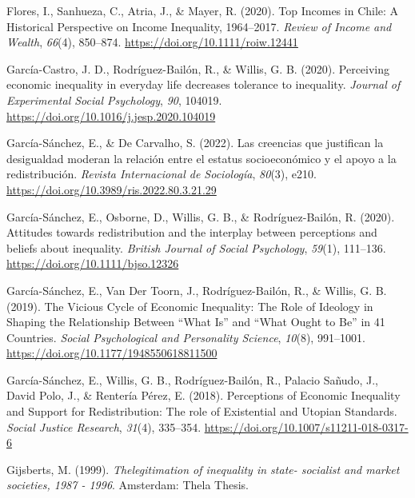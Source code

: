 \documentclass[
  12pt,
]{article}
\newlength{\cslhangindent}
\newenvironment{CSLReferences}[2] %
 {\begin{list}{}{%
  \setlength{\itemindent}{0pt}
  \setlength{\leftmargin}{0pt}
  \setlength{\parsep}{0pt}
  \ifodd #1
   \setlength{\leftmargin}{\cslhangindent}
   \setlength{\itemindent}{-1\cslhangindent}
  \fi
  \setlength{\itemsep}{#2\baselineskip}}}
 {\end{list}}
\begin{document}
\begin{CSLReferences}{1}{0}
Flores, I., Sanhueza, C., Atria, J., \& Mayer, R. (2020). Top {Incomes}
in {Chile}: {A Historical Perspective} on {Income Inequality},
1964--2017. \emph{Review of Income and Wealth}, \emph{66}(4), 850--874.
\url{https://doi.org/10.1111/roiw.12441}

García-Castro, J. D., Rodríguez-Bailón, R., \& Willis, G. B. (2020).
Perceiving economic inequality in everyday life decreases tolerance to
inequality. \emph{Journal of Experimental Social Psychology}, \emph{90},
104019. \url{https://doi.org/10.1016/j.jesp.2020.104019}

García-Sánchez, E., \& De Carvalho, S. (2022). Las creencias que
justifican la desigualdad moderan la relaci{ó}n entre el estatus
socioecon{ó}mico y el apoyo a la redistribuci{ó}n. \emph{Revista
Internacional de Sociolog{í}a}, \emph{80}(3), e210.
\url{https://doi.org/10.3989/ris.2022.80.3.21.29}

García-Sánchez, E., Osborne, D., Willis, G. B., \& Rodríguez-Bailón, R.
(2020). Attitudes towards redistribution and the interplay between
perceptions and beliefs about inequality. \emph{British Journal of
Social Psychology}, \emph{59}(1), 111--136.
\url{https://doi.org/10.1111/bjso.12326}

García-Sánchez, E., Van Der Toorn, J., Rodríguez-Bailón, R., \& Willis,
G. B. (2019). The {Vicious Cycle} of {Economic Inequality}: {The Role}
of {Ideology} in {Shaping} the {Relationship Between} {``{What Is}''}
and {``{What Ought} to {Be}''} in 41 {Countries}. \emph{Social
Psychological and Personality Science}, \emph{10}(8), 991--1001.
\url{https://doi.org/10.1177/1948550618811500}

García-Sánchez, E., Willis, G. B., Rodríguez-Bailón, R., Palacio Sañudo,
J., David Polo, J., \& Rentería Pérez, E. (2018). Perceptions of
{Economic Inequality} and {Support} for {Redistribution}: {The} role of
{Existential} and {Utopian Standards}. \emph{Social Justice Research},
\emph{31}(4), 335--354. \url{https://doi.org/10.1007/s11211-018-0317-6}

Gijsberts, M. (1999). \emph{{Thelegitimation of inequality in state-
socialist and market societies, 1987 - 1996}}. Amsterdam: Thela Thesis.


\end{CSLReferences}
\end{document}
